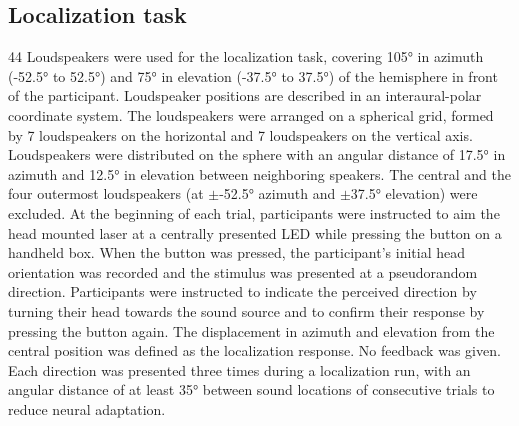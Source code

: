 \documentclass[preprint]{JASA}
\begin{document}
\subsection{Localization task} 
44 Loudspeakers were used for the localization task, covering 105° in azimuth (-52.5° to 52.5°) and 75° in elevation (-37.5° to 37.5°) of the hemisphere in front of the participant. Loudspeaker positions are described in an interaural-polar coordinate system. The loudspeakers were arranged on a spherical grid, formed by 7 loudspeakers on the horizontal and 7 loudspeakers on the vertical axis. Loudspeakers were distributed on the sphere with an angular distance of 17.5° in azimuth and 12.5° in elevation between neighboring speakers. The central and the four outermost loudspeakers (at $\pm$-52.5° azimuth and  $\pm$37.5° elevation) were excluded. At the beginning of each trial, participants were instructed to aim the head mounted laser at a centrally presented LED while pressing the button on a handheld box. When the button was pressed, the participant’s initial head orientation was recorded and the stimulus was presented at a pseudorandom direction. Participants were instructed to indicate the perceived direction by turning their head towards the sound source and to confirm their response by pressing the button again. The displacement in azimuth and elevation from the central position was defined as the localization response. No feedback was given. Each direction was presented three times during a localization run, with an angular distance of at least 35° between sound locations of consecutive trials to reduce neural adaptation.
\end{document}
